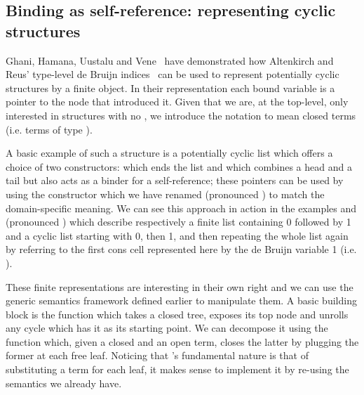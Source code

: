 \subsection{Binding as self-reference: representing cyclic structures}\label{def:colist}

Ghani, Hamana, Uustalu and Vene~\citeyear{ghani2006representing} have
demonstrated how Altenkirch and Reus' type-level de Bruijn
indices~\citeyear{altenkirch1999monadic} can be used to represent
potentially cyclic structures by a finite object. In their
representation each bound variable is a pointer to the node
that introduced it. Given that we are, at the top-level, only
interested in structures with no , we introduce
the notation   to mean closed terms (i.e. terms of type
   \AIC{[]}).

A basic example of such a structure is a potentially cyclic list which
offers a choice of two constructors: \AIC{[]} which ends the list and
\AIC{\_::\_} which combines a head and a tail but also acts as a binder
for a self-reference; these pointers can be used by using the 
constructor which we have renamed  (pronounced )
to match the domain-specific meaning.
We can see this approach in action in the examples
\AF{[0, 1]} and  (pronounced ) which describe
respectively a finite list containing
0 followed by 1 and a cyclic list starting with 0, then 1, and then
repeating the whole list again by referring to the first cons cell
represented here by the de Bruijn variable 1 (i.e.  ).

\noindent
\begin{minipage}{\textwidth}
  \begin{minipage}{0.55\textwidth}
  \end{minipage}
  \begin{minipage}{0.35\textwidth}
  \end{minipage}
\end{minipage}

These finite representations are interesting in their own right
and we can use the generic semantics framework defined earlier
to manipulate them. A basic building block is the 
function which takes a closed tree, exposes its top node and
unrolls any cycle which has it as its starting point. We can
decompose it using the  function which, given a closed
and an open term, closes the latter by plugging the former at
each free  leaf. Noticing that 's fundamental nature
is that of substituting a term for each leaf, it makes sense to
implement it by re-using the  semantics we already have.

